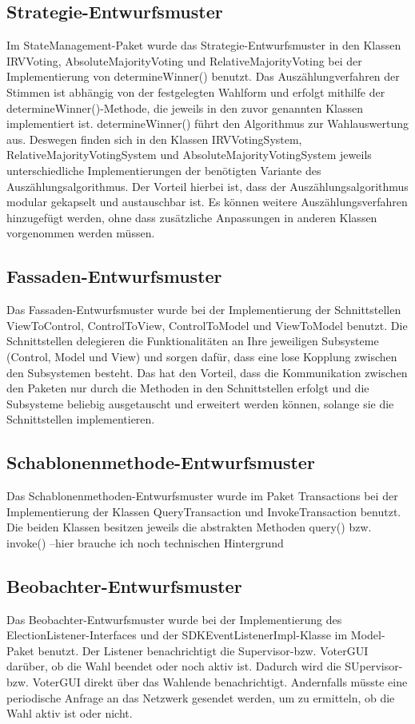 \documentclass[parskip=full]{scrartcl}
\begin{document}
\subsection{Strategie-Entwurfsmuster}
Im StateManagement-Paket wurde das Strategie-Entwurfsmuster in den Klassen IRVVoting, AbsoluteMajorityVoting und RelativeMajorityVoting bei der Implementierung von determineWinner() benutzt.
Das Auszählungverfahren der Stimmen ist abhängig von der festgelegten Wahlform und erfolgt mithilfe der determineWinner()-Methode, die jeweils in den zuvor genannten Klassen implementiert ist.
determineWinner() führt den Algorithmus zur Wahlauswertung aus. Deswegen finden sich in den Klassen IRVVotingSystem, RelativeMajorityVotingSystem und AbsoluteMajorityVotingSystem jeweils unterschiedliche Implementierungen der benötigten Variante des Auszählungsalgorithmus.
Der Vorteil hierbei ist, dass der Auszählungsalgorithmus modular gekapselt und austauschbar ist. Es können weitere Auszählungsverfahren hinzugefügt werden, ohne dass zusätzliche Anpassungen in anderen Klassen vorgenommen werden müssen.

\subsection{Fassaden-Entwurfsmuster}
Das Fassaden-Entwurfsmuster wurde bei der Implementierung der Schnittstellen ViewToControl, ControlToView, ControlToModel und ViewToModel benutzt. Die Schnittstellen delegieren die Funktionalitäten an Ihre jeweiligen Subsysteme (Control, Model und View) und sorgen dafür, dass eine lose Kopplung zwischen den Subsystemen besteht.
Das hat den Vorteil, dass die Kommunikation zwischen den Paketen nur durch die Methoden in den Schnittstellen erfolgt und die Subsysteme beliebig ausgetauscht und erweitert werden können, solange sie die Schnittstellen implementieren.

\subsection{Schablonenmethode-Entwurfsmuster}
Das Schablonenmethoden-Entwurfsmuster wurde im Paket Transactions bei der Implementierung der Klassen QueryTransaction und InvokeTransaction benutzt.
Die beiden Klassen besitzen jeweils die abstrakten Methoden query() bzw. invoke() --hier brauche ich noch technischen Hintergrund

\subsection{Beobachter-Entwurfsmuster}
Das Beobachter-Entwurfsmuster wurde bei der Implementierung des ElectionListener-Interfaces und der SDKEventListenerImpl-Klasse im Model-Paket benutzt. Der Listener benachrichtigt die Supervisor-bzw. VoterGUI darüber, ob die Wahl beendet oder noch aktiv ist. Dadurch wird die SUpervisor- bzw. VoterGUI direkt über das Wahlende benachrichtigt. Andernfalls müsste eine periodische Anfrage an das Netzwerk gesendet werden, um zu ermitteln, ob die Wahl aktiv ist oder nicht. 
\end{document}
